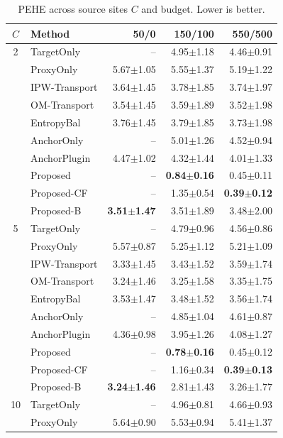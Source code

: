 \begin{table}[t]
\centering
\caption{PEHE across source sites $C$ and budget. Lower is better.}
\label{tab:sources_sweep}
\scriptsize
\setlength{\tabcolsep}{2pt}
\begin{tabular}{@{}cl|rrr@{}}
\toprule
$C$ & Method & 50/0 & 150/100 & 550/500 \\
\midrule
2 & TargetOnly & -- & 4.95$\pm$1.18 & 4.46$\pm$0.91 \\
 & ProxyOnly & 5.67$\pm$1.05 & 5.55$\pm$1.37 & 5.19$\pm$1.22 \\
 & IPW-Transport & 3.64$\pm$1.45 & 3.78$\pm$1.85 & 3.74$\pm$1.97 \\
 & OM-Transport & 3.54$\pm$1.45 & 3.59$\pm$1.89 & 3.52$\pm$1.98 \\
 & EntropyBal & 3.76$\pm$1.45 & 3.79$\pm$1.85 & 3.73$\pm$1.98 \\
 & AnchorOnly & -- & 5.01$\pm$1.26 & 4.52$\pm$0.94 \\
 & AnchorPlugin & 4.47$\pm$1.02 & 4.32$\pm$1.44 & 4.01$\pm$1.33 \\
 & Proposed & -- & \textbf{0.84$\pm$0.16} & 0.45$\pm$0.11 \\
 & Proposed-CF & -- & 1.35$\pm$0.54 & \textbf{0.39$\pm$0.12} \\
 & Proposed-B & \textbf{3.51$\pm$1.47} & 3.51$\pm$1.89 & 3.48$\pm$2.00 \\
\midrule
5 & TargetOnly & -- & 4.79$\pm$0.96 & 4.56$\pm$0.86 \\
 & ProxyOnly & 5.57$\pm$0.87 & 5.25$\pm$1.12 & 5.21$\pm$1.09 \\
 & IPW-Transport & 3.33$\pm$1.45 & 3.43$\pm$1.52 & 3.59$\pm$1.74 \\
 & OM-Transport & 3.24$\pm$1.46 & 3.25$\pm$1.58 & 3.35$\pm$1.75 \\
 & EntropyBal & 3.53$\pm$1.47 & 3.48$\pm$1.52 & 3.56$\pm$1.74 \\
 & AnchorOnly & -- & 4.85$\pm$1.04 & 4.61$\pm$0.87 \\
 & AnchorPlugin & 4.36$\pm$0.98 & 3.95$\pm$1.26 & 4.08$\pm$1.27 \\
 & Proposed & -- & \textbf{0.78$\pm$0.16} & 0.45$\pm$0.12 \\
 & Proposed-CF & -- & 1.16$\pm$0.34 & \textbf{0.39$\pm$0.13} \\
 & Proposed-B & \textbf{3.24$\pm$1.46} & 2.81$\pm$1.43 & 3.26$\pm$1.77 \\
\midrule
10 & TargetOnly & -- & 4.96$\pm$0.81 & 4.66$\pm$0.93 \\
 & ProxyOnly & 5.64$\pm$0.90 & 5.53$\pm$0.94 & 5.41$\pm$1.37 \\

\end{tabular}
\end{table}
